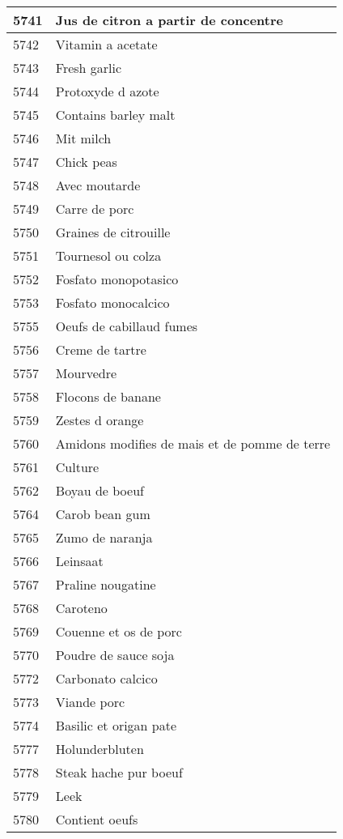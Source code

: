 \begin{longtable}{|l|l|}
5741 & Jus de citron a partir de concentre \\ \hline 
5742 & Vitamin a acetate \\ \hline 
5743 & Fresh garlic \\ \hline 
5744 & Protoxyde d azote \\ \hline 
5745 & Contains barley malt \\ \hline 
5746 & Mit milch \\ \hline 
5747 & Chick peas \\ \hline 
5748 & Avec moutarde \\ \hline 
5749 & Carre de porc \\ \hline 
5750 & Graines de citrouille \\ \hline 
5751 & Tournesol ou colza \\ \hline 
5752 & Fosfato monopotasico \\ \hline 
5753 & Fosfato monocalcico \\ \hline 
5755 & Oeufs de cabillaud fumes \\ \hline 
5756 & Creme de tartre \\ \hline 
5757 & Mourvedre \\ \hline 
5758 & Flocons de banane \\ \hline 
5759 & Zestes d orange \\ \hline 
5760 & Amidons modifies de mais et de pomme de terre \\ \hline 
5761 & Culture \\ \hline 
5762 & Boyau de boeuf \\ \hline 
5764 & Carob bean gum \\ \hline 
5765 & Zumo de naranja \\ \hline 
5766 & Leinsaat \\ \hline 
5767 & Praline nougatine \\ \hline 
5768 & Caroteno \\ \hline 
5769 & Couenne et os de porc \\ \hline 
5770 & Poudre de sauce soja \\ \hline 
5772 & Carbonato calcico \\ \hline 
5773 & Viande porc \\ \hline 
5774 & Basilic et origan pate \\ \hline 
5777 & Holunderbluten \\ \hline 
5778 & Steak hache pur boeuf \\ \hline 
5779 & Leek \\ \hline 
5780 & Contient oeufs \\ \hline 

\end{longtable}
